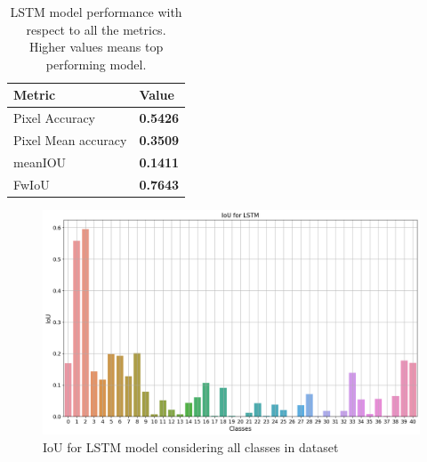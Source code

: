 	\begin{table}
	\begin{center}
		\begin{tabular}{ | l | p{12cm} |}
			\hline		
			\cellcolor{purple!30}Metric & \cellcolor{purple!30}Value \\ \hline
			Pixel Accuracy & { \bf 0.5426 }  \\ \hline
			Pixel Mean accuracy & { \bf 0.3509 }   \\ \hline
			meanIOU & { \bf 0.1411 }  \\ \hline
			FwIoU & { \bf 0.7643 }  \\ \hline
			\hline
		\end{tabular}
		\caption{LSTM model performance with respect to all the metrics. Higher values means top performing model.}
		\label{tab:unet_lstm}
	\end{center}
	\end{table}
	
	\begin{figure}
		\centering
		\includegraphics[width=13cm]{images/iou_lstm_scannet_all_classes.png}
		\caption{IoU for LSTM model considering all classes in dataset}
		\label{fig:scannet_class}
	\end{figure} 


